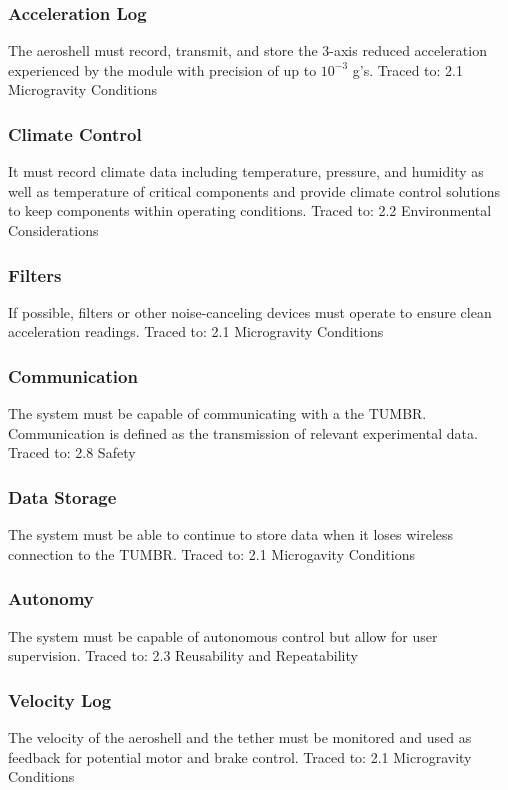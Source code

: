 \subsubsection*{Acceleration Log}
\indent\indent The aeroshell must record, transmit, and store the 3-axis reduced acceleration experienced by the module with precision of up to $10^{\minus3}$ g’s. Traced to: 2.1 Microgravity Conditions

\subsubsection*{Climate Control}
\indent\indent It must record climate data including temperature, pressure, and humidity as well as temperature of critical components and provide climate control solutions to keep components within operating conditions. Traced to: 2.2 Environmental Considerations

\subsubsection*{Filters}
\indent\indent If possible, filters or other noise-canceling devices must operate to ensure clean acceleration readings. Traced to: 2.1 Microgravity Conditions

\subsubsection*{Communication}
\indent\indent The system must be capable of communicating with a the TUMBR. Communication is defined as the transmission of relevant experimental data. Traced to: 2.8 Safety

\subsubsection*{Data Storage}
\indent\indent The system must be able to continue to store data when it loses wireless connection to the TUMBR. Traced to: 2.1 Microgavity Conditions

\subsubsection*{Autonomy}
\indent\indent The system must be capable of autonomous control but allow for user supervision. Traced to: 2.3 Reusability and Repeatability

\subsubsection*{Velocity Log}
\indent\indent The velocity of the aeroshell and the tether must be monitored and used as feedback for potential motor and brake control. Traced to: 2.1 Microgravity Conditions

